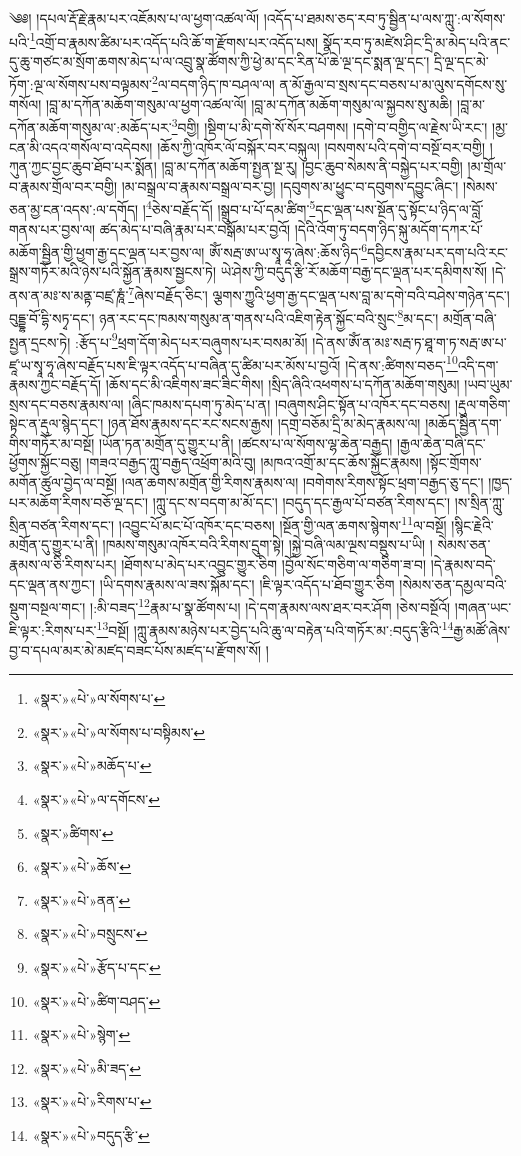 ༄༅། །དཔལ་རྡོ་རྗེ་རྣམ་པར་འཇོམས་པ་ལ་ཕྱག་འཚལ་ལོ། །འདོད་པ་ཐམས་ཅད་རབ་ཏུ་སྦྱིན་པ་ལས་ཀླུ་:ལ་སོགས་པའི་\footnote{«སྣར་»«པེ་»ལ་སོགས་པ་}འགྲོ་བ་རྣམས་ཚིམ་པར་འདོད་པའི་ཆོ་ག་རྫོགས་པར་འདོད་པས། སྣོད་རབ་ཏུ་མཛེས་ཤིང་དྲི་མ་མེད་པའི་ནང་དུ་ཆུ་གཙང་མ་སྲོག་ཆགས་མེད་པ་ལ་འབྲུ་སྣ་ཚོགས་ཀྱི་ཕྱེ་མ་དང་རིན་པོ་ཆེ་ལྔ་དང་སྨན་ལྔ་དང་། དྲི་ལྔ་དང་མེ་ཏོག་:ལྔ་ལ་སོགས་པས་བལྟམས་\footnote{«སྣར་»«པེ་»ལ་སོགས་པ་བསྟིམས་}ལ་བདག་ཉིད་ཁ་བཤལ་ལ། ན་མོ་རྒྱལ་བ་སྲས་དང་བཅས་པ་མ་ལུས་དགོངས་སུ་གསོལ། །བླ་མ་དཀོན་མཆོག་གསུམ་ལ་ཕྱག་འཚལ་ལོ། །བླ་མ་དཀོན་མཆོག་གསུམ་ལ་སྐྱབས་སུ་མཆི། །བླ་མ་དཀོན་མཆོག་གསུམ་ལ་:མཆོད་པར་\footnote{«སྣར་»«པེ་»མཆོད་པ་}བགྱི། །སྡིག་པ་མི་དགེ་སོ་སོར་བཤགས། །དགེ་བ་བགྱིད་ལ་རྗེས་ཡི་རང་། །མྱ་ངན་མི་འདའ་གསོལ་བ་འདེབས། །ཆོས་ཀྱི་འཁོར་ལོ་བསྐོར་བར་བསྐུལ། །བསགས་པའི་དགེ་བ་བསྔོ་བར་བགྱི། །ཀུན་ཀྱང་བྱང་ཆུབ་ཐོབ་པར་སྨོན། །བླ་མ་དཀོན་མཆོག་སྤྱན་སྔ་རུ། །བྱང་ཆུབ་སེམས་ནི་བསྐྱེད་པར་བགྱི། །མ་གྲོལ་བ་རྣམས་གྲོལ་བར་བགྱི། །མ་བསྒྲལ་བ་རྣམས་བསྒྲལ་བར་བྱ། །དབུགས་མ་ཕྱུང་བ་དབུགས་དབྱུང་ཞིང་། །སེམས་ཅན་མྱ་ངན་འདས་:ལ་དགོད། །\footnote{«སྣར་»«པེ་»ལ་དགོངས་}ཅེས་བརྗོད་དོ། །སྒྲུབ་པ་པོ་དམ་ཚིག་\footnote{«སྣར་»ཚིགས་}དང་ལྡན་པས་སྔོན་དུ་སྟོང་པ་ཉིད་ལ་བློ་གནས་པར་བྱས་ལ། ཚད་མེད་པ་བཞི་རྣམ་པར་བསྒོམ་པར་བྱའོ། །དེའི་འོག་ཏུ་བདག་ཉིད་སྐུ་མདོག་དཀར་པོ་མཆོག་སྦྱིན་གྱི་ཕྱག་རྒྱ་དང་ལྡན་པར་བྱས་ལ། ཨོཾ་སརྦ་ཨ་ཡ་སྭཱ་ཧཱ་ཞེས་:ཆོས་ཉིད་\footnote{«སྣར་»«པེ་»ཆོས་}དབྱིངས་རྣམ་པར་དག་པའི་རང་སྒྲས་གཏོར་མའི་ཉེས་པའི་སྐྱོན་རྣམས་སྦྱངས་ཏེ། ཡེ་ཤེས་ཀྱི་བདུད་རྩི་རོ་མཆོག་བརྒྱ་དང་ལྡན་པར་དམིགས་སོ། །དེ་ནས་ན་མཿ་ས་མནྟ་བཛྲ་ཎཱཾ་\footnote{«སྣར་»«པེ་»ནན་}ཞེས་བརྗོད་ཅིང་། ལྕགས་ཀྱུའི་ཕྱག་རྒྱ་དང་ལྡན་པས་བླ་མ་དགེ་བའི་བཤེས་གཉེན་དང་། བུདྡྷ་བོ་དྷི་སཏྭ་དང་། ཉན་རང་དང་ཁམས་གསུམ་ན་གནས་པའི་འཇིག་རྟེན་སྐྱོང་བའི་སྲུང་\footnote{«སྣར་»«པེ་»བསྲུངས་}མ་དང་། མགྲོན་བཞི་སྤྱན་དྲངས་ཏེ། :རྩོད་པ་\footnote{«སྣར་»«པེ་»རྩོད་པ་དང་}ཕྲག་དོག་མེད་པར་བཞུགས་པར་བསམ་མོ། །དེ་ནས་ཨོཾ་ན་མཿ་སརྦ་ཏ་ཐཱ་ག་ཏ་སརྦ་ཨ་པ་ཛཱ་ཡ་སྭཱ་ཧཱ་ཞེས་བརྗོད་པས་ཇི་ལྟར་འདོད་པ་བཞིན་དུ་ཚིམ་པར་མོས་པ་བྱའོ། །དེ་ནས་:ཚིགས་བཅད་\footnote{«སྣར་»«པེ་»ཚིག་བཤད་}འདི་དག་རྣམས་ཀྱང་བརྗོད་དོ། །ཆོས་དང་མི་འཇིགས་ཟང་ཟིང་གིས། །སྲིད་ཞིའི་འཕགས་པ་དཀོན་མཆོག་གསུམ། །ཡབ་ཡུམ་སྲས་དང་བཅས་རྣམས་ལ། །ཞིང་ཁམས་དཔག་ཏུ་མེད་པ་ན། །བཞུགས་ཤིང་སྟོན་པ་འཁོར་དང་བཅས། །རྡུལ་གཅིག་སྟེང་ན་རྡུལ་སྙེད་དང་། །ཉན་ཐོས་རྣམས་དང་རང་སངས་རྒྱས། །དགྲ་བཅོམ་དྲི་མ་མེད་རྣམས་ལ། །མཆོད་སྦྱིན་དག་གིས་གཏོར་མ་བསྔོ། །ཡོན་ཏན་མགྲོན་དུ་གྱུར་པ་ནི། །ཚངས་པ་ལ་སོགས་ལྷ་ཆེན་བརྒྱད། །རྒྱལ་ཆེན་བཞི་དང་ཕྱོགས་སྐྱོང་བཅུ། །གཟའ་བརྒྱད་ཀླུ་བརྒྱད་འཕྲོག་མའི་བུ། །མཁའ་འགྲོ་མ་དང་ཆོས་སྐྱོང་རྣམས། །སྟོང་གྲོགས་མགོན་ཚུལ་བྱེད་ལ་བསྔོ། །ལན་ཆགས་མགྲོན་གྱི་རིགས་རྣམས་ལ། །བགེགས་རིགས་སྟོང་ཕྲག་བརྒྱད་ཅུ་དང་། །ཁྱད་པར་མཆོག་རིགས་བཅོ་ལྔ་དང་། །ཀླུ་དང་ས་བདག་མ་མོ་དང་། །བདུད་དང་རྒྱལ་པོ་བཙན་རིགས་དང་། །ས་སྲིན་ཀླུ་སྲིན་བཙན་རིགས་དང་། །འབྱུང་པོ་མང་པོ་འཁོར་དང་བཅས། །སྔོན་གྱི་ལན་ཆགས་སྙེགས་\footnote{«སྣར་»«པེ་»སྙེག་}ལ་བསྔོ། །སྙིང་རྗེའི་མགྲོན་དུ་གྱུར་པ་ནི། །ཁམས་གསུམ་འཁོར་བའི་རིགས་དྲུག་སྟེ། །སྐྱེ་བཞི་ལམ་ལྔས་བསྡུས་པ་ཡི། །
སེམས་ཅན་རྣམས་ལ་ཅི་རིགས་པར། །ཐོགས་པ་མེད་པར་འབྱུང་གྱུར་ཅིག །བྱོལ་སོང་གཅིག་ལ་གཅིག་ཟ་བ། །དེ་རྣམས་བདེ་དང་ལྡན་ནས་ཀྱང་། །ཡི་དགས་རྣམས་ལ་ཟས་སྐོམ་དང་། །ཇི་ལྟར་འདོད་པ་ཐོབ་གྱུར་ཅིག །སེམས་ཅན་དམྱལ་བའི་སྡུག་བསྔལ་གང་། །:མི་བཟད་\footnote{«སྣར་»«པེ་»མི་ཟད་}རྣམ་པ་སྣ་ཚོགས་པ། །དེ་དག་རྣམས་ལས་ཐར་བར་ཤོག །ཅེས་བསྔོའོ། །གཞན་ཡང་ཇི་ལྟར་:རིགས་པར་\footnote{«སྣར་»«པེ་»རིགས་པ་}བསྔོ། །ཀླུ་རྣམས་མཉེས་པར་བྱེད་པའི་ཆུ་ལ་བརྟེན་པའི་གཏོར་མ་:བདུད་རྩིའི་\footnote{«སྣར་»«པེ་»བདུད་རྩི་}རྒྱ་མཚོ་ཞེས་བྱ་བ་དཔལ་མར་མེ་མཛད་བཟང་པོས་མཛད་པ་རྫོགས་སོ། །